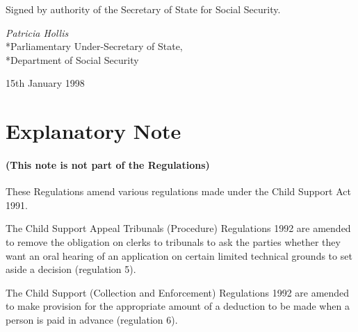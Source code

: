 \documentclass[12pt,a4paper]{article}
\begin{document}

\bigskip

Signed 
by authority of the Secretary of State for Social Security.

{\raggedleft
\emph{Patricia Hollis}\\*Parliamentary Under-Secretary of State,\\*Department of Social Security

}

15th January 1998

\small

\part{Explanatory Note}

\renewcommand\parthead{--- Explanatory Note}

\subsection*{(This note is not part of the Regulations)}

These Regulations amend various regulations made under the Child Support Act 1991.

\begin{sloppypar}
  The Child Support Appeal Tribunals (Procedure) Regulations 1992 are amended to remove the obligation on clerks to tribunals to ask the parties whether they want an oral hearing of an application on certain limited technical grounds to set aside a decision (regulation 5).
\end{sloppypar}

\begin{sloppypar}
  The Child Support (Collection and Enforcement) Regulations 1992 are amended to make provision for the appropriate amount of a deduction to be made when a person is paid in advance (regulation 6).
\end{sloppypar}
\end{document}
